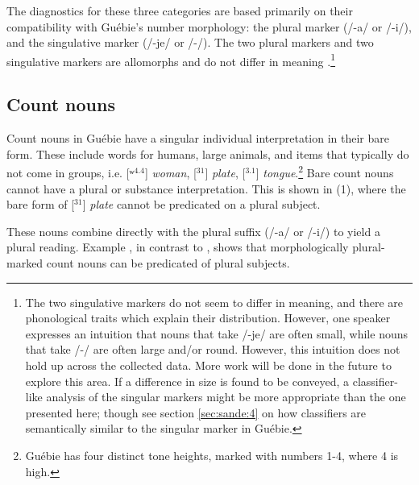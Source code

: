 \documentclass[output=paper,colorlinks,citecolor=brown]{langscibook}
\begin{document}
The diagnostics for these three categories are based primarily on their compatibility with Guébie's number morphology: the plural marker (/-a/ or /-i/), and the singulative marker (/-je/ or /-/). The two plural markers and two singulative markers are allomorphs and do not differ in meaning \citep{Sande2017}.\footnote{The two singulative markers do not seem to differ in meaning, and there are phonological traits which explain their distribution. However, one speaker expresses an intuition that nouns that take /-je/ are often small, while nouns that take /-/ are often large and/or round. However, this intuition does not hold up across the collected data. More work will be done in the future to explore this area. If a difference in size is found to be conveyed, a classifier-like analysis of the singular markers might be more appropriate than the one presented here; though see section \ref{sec:sande:4} on how classifiers are semantically similar to the singular marker in Guébie.}

\subsection{Count nouns}\label{sec:sande:2.1}

Count nouns in Guébie have a singular individual interpretation in their bare form. These include words for humans, large animals, and items that typically do not come in groups, i.e. [ʷ$^{4.4}$] \textit{woman}, [$^{31}$] \textit{plate}, [$^{3.1}$] \textit{tongue}.\footnote{Guébie has four distinct tone heights, marked with numbers 1-4, where 4 is high.} Bare count nouns cannot have a plural or substance interpretation. This is shown in (1), where the bare form of [$^{31}$] \textit{plate} cannot be predicated on a plural subject.

\z

These nouns combine directly with the plural suffix (/-a/ or /-i/) to yield a plural reading. Example , in contrast to , shows that morphologically plural-marked count nouns can be predicated of plural subjects.
\end{document}
